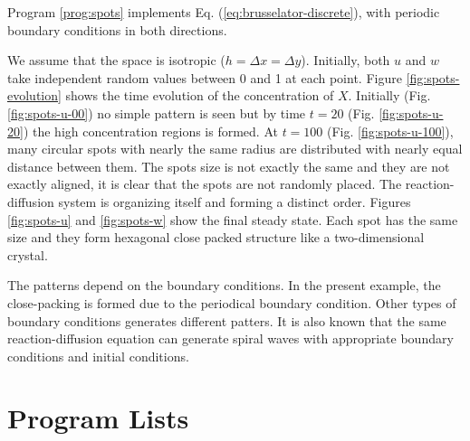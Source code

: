 Program \ref{prog:spots} implements Eq. (\ref{eq:brusselator-discrete}), with periodic boundary conditions in both directions.

We assume that the space is isotropic ($h=\Delta x = \Delta y$).
Initially, both $u$ and $w$ take independent random values between 0 and 1 at each point. 
Figure \ref{fig:spots-evolution} shows the time evolution of the concentration of $X$. Initially (Fig. \ref{fig:spots-u-00}) no simple pattern is seen but by time $t=20$ (Fig. \ref{fig:spots-u-20}) the high concentration regions is formed.  At $t=100$ (Fig. \ref{fig:spots-u-100}),  many circular spots with nearly the same radius are distributed with nearly equal distance between them.  The spots size is not exactly the same and they are not exactly aligned, it is clear that the spots are not randomly placed.  The reaction-diffusion system is organizing itself and forming a distinct order.
Figures \ref{fig:spots-u} and \ref{fig:spots-w} show the final steady state.  Each spot has the same size and they form hexagonal close packed structure like a two-dimensional crystal.

The patterns depend on the boundary conditions.  In the present example, the close-packing is formed due to the periodical boundary condition.  Other types of boundary conditions generates different patters.  It is also known that the same reaction-diffusion equation can generate spiral waves with appropriate boundary conditions and initial conditions. 


\newpage
\noindent
\section*{Program Lists}

